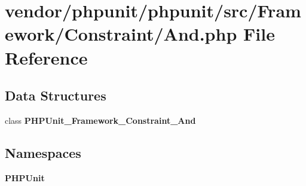 \section{vendor/phpunit/phpunit/src/\+Framework/\+Constraint/\+And.php File Reference}
\label{_and_8php}
\subsection*{Data Structures}
\begin{DoxyCompactItemize}
\item 
class {\bf P\+H\+P\+Unit\+\_\+\+Framework\+\_\+\+Constraint\+\_\+\+And}
\end{DoxyCompactItemize}
\subsection*{Namespaces}
\begin{DoxyCompactItemize}
\item 
 {\bf P\+H\+P\+Unit}
\end{DoxyCompactItemize}
